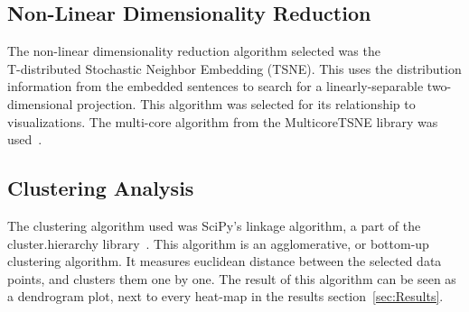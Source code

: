 \subsection{Non-Linear Dimensionality Reduction}\label{sub:Non-Linear Dimentionality Reduction}
The non-linear dimensionality reduction algorithm selected was the \\ T-distributed Stochastic Neighbor Embedding (TSNE). This uses the distribution information from the embedded sentences to search for a linearly-separable two-dimensional projection. This algorithm was selected for its relationship to visualizations. The multi-core algorithm from the MulticoreTSNE library was used~\cite{ulyanov2016tsne}.


\subsection{Clustering Analysis}\label{sub:Clustering Analysis}
The clustering algorithm used was SciPy's linkage algorithm, a part of the cluster.hierarchy library~\cite{scipy2020}. This algorithm is an agglomerative, or bottom-up clustering algorithm. It measures euclidean distance between the selected data points, and clusters them one by one. The result of this algorithm can be seen as a dendrogram plot, next to every heat-map in the results section~\ref{sec:Results}.
